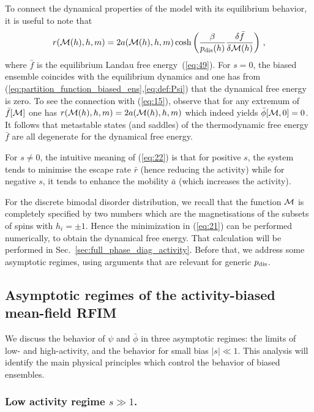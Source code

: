 \documentclass{iopart}
\newcommand{\eqref}[1]{(\ref{#1})}
\begin{document}
To connect the dynamical properties of the model with its equilibrium behavior, it is useful to note that
\begin{equation}
  \label{eq:15}
  r({\cal M}(h), h, m) = 2 a({\cal M}(h), h, m) \cosh\left( \frac{\beta}{p_{\rm dis}(h)} \frac{\delta \bar{f}}{\delta {\cal M}(h)}\right) \, ,
\end{equation}
where $\bar{f}$ is the equilibrium Landau free energy~\eqref{eq:49}.
%
For $s=0$, the biased ensemble coincides with the equilibrium dynamics and one has from (\ref{eq:partition_function_biased_ens},\ref{eq:def:Psi}) that the dynamical free energy is zero.  To see the connection with (\ref{eq:15}), observe that  for any extremum of $\bar{f}[{\cal M}]$ one has $r({\cal M}(h), h, m) = 2 a({\cal M}(h), h, m)$ which indeed yields $\bar\phi[{\cal M},0]=0$.  It follows that metastable states (and saddles) of the thermodynamic free energy $\bar f$ are all degenerate for the dynamical free energy.

For $s\neq0$, the intuitive meaning of (\ref{eq:22}) is that for positive $s$, the system tends to minimise the escape rate $\bar r$ (hence reducing the activity) while for negative $s$, it tends to enhance the mobility $\bar a$ (which increases the activity).

For the discrete bimodal disorder distribution, we recall that the function ${\cal M}$ is completely specified by two numbers which are the magnetisations of the subsets of spins with $h_i=\pm1$.  Hence the minimization in (\ref{eq:21}) can be performed numerically, to obtain the dynamical free energy.  That calculation will be performed in Sec.~\ref{sec:full_phase_diag_activity}.  Before that, we address some asymptotic regimes, using arguments that are relevant for generic $p_{\rm dis}$.


\subsection{Asymptotic regimes of the activity-biased mean-field RFIM}
\label{sec:asymp-dyn}

We discuss the behavior of $\psi$ and $\bar\phi$ in three asymptotic regimes: the limits of low- and high-activity, and the behavior for small bias $|s|\ll 1$.
This analysis will identify the main physical principles which control the behavior of biased ensembles.


\subsubsection{Low activity regime $s\gg 1$.}\label{sec:low_act_reg}
\end{document}
